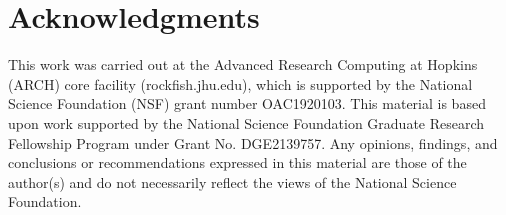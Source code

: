 \section{Acknowledgments}\label{sec:Acknowledgments}
This work was carried out at the Advanced Research Computing at Hopkins (ARCH) core facility  (rockfish.jhu.edu), which is supported by the National Science Foundation (NSF) grant number OAC1920103. This material is based upon work supported by the National Science Foundation Graduate Research Fellowship Program under Grant No. DGE2139757. Any opinions, findings, and conclusions or recommendations expressed in this material are those of the author(s) and do not necessarily reflect the views of the National Science Foundation.

